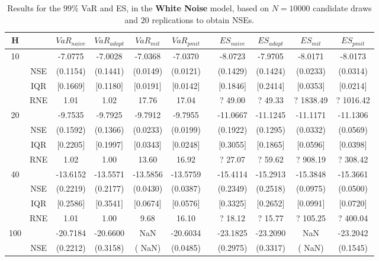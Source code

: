 \footnotesize{  
{ \renewcommand{\arraystretch}{1.3} 
\begin{longtable}{ccccccccccc}  
\caption{Results for the $99\%$ VaR and ES, in the \textbf{White Noise} model, based on $N=10000$ candidate draws and $20$ replications to obtain NSEs.} 
\label{tab:res_algos_WN} \\ 
 H & & $VaR_{naive}$ & $VaR_{adapt}$ & $VaR_{mit}$  & $VaR_{pmit}$ &  & $ES_{naive}$ & $ES_{adapt}$ & $ES_{mit}$ & $ES_{pmit}$ \\ \hline 
10 & & -7.0775 & -7.0028 & -7.0368 & -7.0370 & & -8.0723 & -7.9705 & -8.0171 & -8.0173  \\ 
  & NSE & (0.1154) & (0.1441) & (0.0149) & (0.0121) & & (0.1429) & (0.1424) & (0.0233) & (0.0314)   \\ 
 & IQR & $[$0.1669$]$ & $[$0.1180$]$ & $[$0.0191$]$ & $[$0.0142$]$ & & $[$0.1846$]$ & $[$0.2414$]$  &$[$0.0353$]$ & $[$0.0214$]$  \\  
  & RNE &   1.01 &   1.02 &  17.76 &  17.04 &  &?  49.00 & ?  49.33 &  ? 1838.49 & ? 1016.42   \\ [1ex] 
20 & & -9.7535 & -9.7925 & -9.7912 & -9.7955 & & -11.0667 & -11.1245 & -11.1171 & -11.1306  \\ 
  & NSE & (0.1592) & (0.1366) & (0.0233) & (0.0199) & & (0.1922) & (0.1295) & (0.0332) & (0.0569)   \\ 
 & IQR & $[$0.2205$]$ & $[$0.1997$]$ & $[$0.0343$]$ & $[$0.0248$]$ & & $[$0.3055$]$ & $[$0.1865$]$  &$[$0.0596$]$ & $[$0.0398$]$  \\  
  & RNE &   1.02 &   1.00 &  13.60 &  16.92 &  &?  27.07 & ?  59.62 &  ? 908.19 & ? 308.42   \\ [1ex] 
40 & & -13.6152 & -13.5571 & -13.5856 & -13.5759 & & -15.4114 & -15.2913 & -15.3848 & -15.3661  \\ 
  & NSE & (0.2219) & (0.2177) & (0.0430) & (0.0387) & & (0.2349) & (0.2518) & (0.0975) & (0.0500)   \\ 
 & IQR & $[$0.2586$]$ & $[$0.3541$]$ & $[$0.0674$]$ & $[$0.0576$]$ & & $[$0.3325$]$ & $[$0.2652$]$  &$[$0.0991$]$ & $[$0.0720$]$  \\  
  & RNE &   1.01 &   1.00 &   9.68 &  16.10 &  &?  18.12 & ?  15.77 &  ? 105.25 & ? 400.04   \\ [1ex] 
100 & & -20.7184 & -20.6600 &    NaN & -20.6034 & & -23.1825 & -23.2090 &    NaN & -23.2042  \\ 
  & NSE & (0.2212) & (0.3158) & (   NaN) & (0.0485) & & (0.2975) & (0.3317) & (   NaN) & (0.1545)   \\ 

\end{longtable}}}
